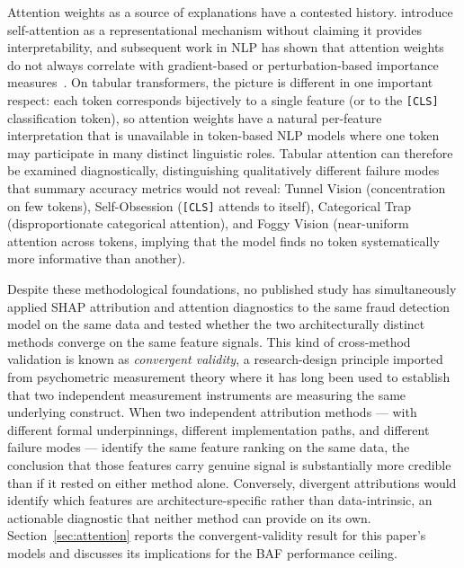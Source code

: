 \documentclass[a4paper,fleqn]{cas-sc}
\begin{document}
Attention weights as a source of explanations have a contested history.
\citet{vaswani2017attention} introduce self-attention as a representational
mechanism without claiming it provides interpretability, and subsequent work in
NLP has shown that attention weights do not always correlate with gradient-based
or perturbation-based importance measures~\citep{molnar2022interpretable}.
On tabular transformers, the picture is different in one important respect: each
token corresponds bijectively to a single feature (or to the \texttt{[CLS]}
classification token), so attention weights have a natural per-feature
interpretation that is unavailable in token-based NLP models where one token
may participate in many distinct linguistic roles.
Tabular attention can therefore be examined diagnostically, distinguishing
qualitatively different failure modes that summary accuracy metrics would not
reveal: Tunnel Vision (concentration on few tokens), Self-Obsession
(\texttt{[CLS]} attends to itself), Categorical Trap (disproportionate
categorical attention), and Foggy Vision (near-uniform attention across
tokens, implying that the model finds no token systematically more informative
than another).

Despite these methodological foundations, no published study has simultaneously
applied SHAP attribution and attention diagnostics to the same fraud detection
model on the same data and tested whether the two architecturally distinct
methods converge on the same feature signals.
This kind of cross-method validation is known as \emph{convergent validity},
a research-design principle imported from psychometric measurement theory
where it has long been used to establish that two independent measurement
instruments are measuring the same underlying construct.
When two independent attribution methods --- with different formal underpinnings,
different implementation paths, and different failure modes --- identify the
same feature ranking on the same data, the conclusion that those features
carry genuine signal is substantially more credible than if it rested on either
method alone.
Conversely, divergent attributions would identify which features are
architecture-specific rather than data-intrinsic, an actionable diagnostic that
neither method can provide on its own.
Section~\ref{sec:attention} reports the convergent-validity result for this
paper's models and discusses its implications for the BAF performance ceiling.

\end{document}
